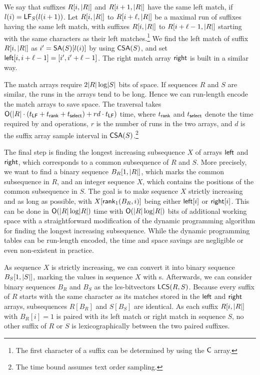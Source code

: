 We say that suffixes $R[i,\lvert R \rvert]$ and $R[i+1,\lvert R \rvert]$ have the same left
match, if $l(i) = \mathsf{LF}_{S}(l(i+1))$. Let $R[i,\lvert R \rvert]$ to $R[i+\ell,\lvert R \rvert]$
be a maximal run of suffixes having the same left match, with suffixes
$R[i,\lvert R \rvert]$ to $R[i+\ell-1,\lvert R \rvert]$ starting with the same characters as
their left matches.\footnote{The first character of a suffix can be determined
by using the $\mathsf{C}$ array.} We find the left match of suffix $R[i,\lvert R \rvert]$ as
$i' = \mathsf{SA}(S)[l(i)]$ by using $\mathsf{CSA}(S)$, and set $\mathsf{left}[i,i+\ell-1] =
[i',i'+\ell-1]$. The right match array $\mathsf{right}$ is built in a similar way.

The match arrays require $2\lvert R \rvert \log \lvert S \rvert$ bits of space. If sequences
$R$ and $S$ are similar, the runs in the arrays tend to be long. Hence we can
run-length encode the match arrays to save space. The traversal takes
$\mathsf{O}(\lvert R \rvert \cdot (t_{\mathsf{LF}} + t_{\mathsf{rank}} + t_{\mathsf{select}}) + rd \cdot
t_{\mathsf{LF}})$ time, where $t_{\mathsf{rank}}$ and $t_{\mathsf{select}}$ denote the time
required by \rank{} and \select{} operations, $r$ is the number of runs in the
two arrays, and $d$ is the suffix array sample interval in
$\mathsf{CSA}(S)$.\footnote{The time bound assumes text order sampling.}

The final step is finding the longest increasing subsequence $X$ of arrays
$\mathsf{left}$ and $\mathsf{right}$, which corresponds to a common subsequence of $R$ and
$S$. More precisely, we want to find a binary sequence $B_{R}[1,\lvert R \rvert]$,
which marks the common subsequence in $R$, and an integer sequence $X$, which
contains the positions of the common subsequence in $S$. The goal is to make
sequence $X$ strictly increasing and as long as possible, with
$X[\mathsf{rank}_{1}(B_{R}, i)]$ being either $\mathsf{left}[i]$ or $\mathsf{right}[i]$. This can
be done in $\mathsf{O}(\lvert R \rvert \log \lvert R \rvert)$ time with $\mathsf{O}(\lvert R \rvert \log \lvert R \rvert)$
bits of additional working space with a straightforward modification of the
dynamic programming algorithm for finding the longest increasing subsequence.
While the dynamic programming tables can be run-length encoded, the time and
space savings are negligible or even non-existent in practice.

As sequence $X$ is strictly increasing, we can convert it into binary sequence
$B_{S}[1,\lvert S \rvert]$, marking the values in sequence $X$ with \onebit{}s.
Afterwards, we can consider binary sequences $B_{R}$ and $B_{S}$ as the
lcs-bitvectors $\mathsf{LCS}(R,S)$. Because every suffix of $R$ starts with the same
character as its matches stored in the $\mathsf{left}$ and $\mathsf{right}$ arrays,
subsequences $R[B_{R}]$ and $S[B_{S}]$ are identical. As each suffix
$R[i,\lvert R \rvert]$ with $B_{R}[i] = 1$ is paired with its left match or right
match in sequence $S$, no other suffix of $R$ or $S$ is lexicographically
between the two paired suffixes.


